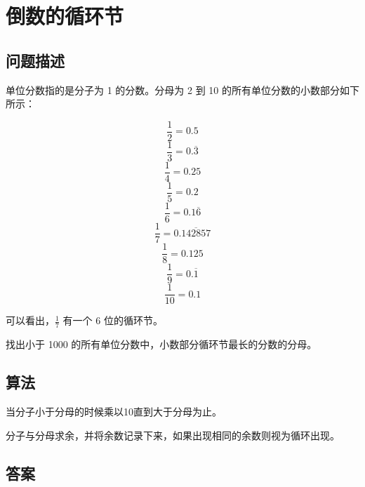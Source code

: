 \section{倒数的循环节}\label{sec:problem26}
\subsection{问题描述}
\begin{tcolorbox}
单位分数指的是分子为 1 的分数。分母为 2 到 10 的所有单位分数的小数部分如下所示：

\[
\frac{1}{2} = 0.5
\]
\[
\frac{1}{3} = 0.\overline{3}
\]
\[
\frac{1}{4} = 0.25
\]
\[
\frac{1}{5} = 0.2
\]
\[
\frac{1}{6} = 0.1\overline{6}
\]
\[
\frac{1}{7} = 0.\overline{142857}
\]
\[
\frac{1}{8} = 0.125
\]
\[
\frac{1}{9} = 0.\overline{1}
\]
\[
\frac{1}{10} = 0.1
\]

可以看出，\( \frac{1}{7} \) 有一个 6 位的循环节。

找出小于 1000 的所有单位分数中，小数部分循环节最长的分数的分母。
\end{tcolorbox}

\subsection{算法}
当分子小于分母的时候乘以10直到大于分母为止。

分子与分母求余，并将余数记录下来，如果出现相同的余数则视为循环出现。

\subsection{答案}
